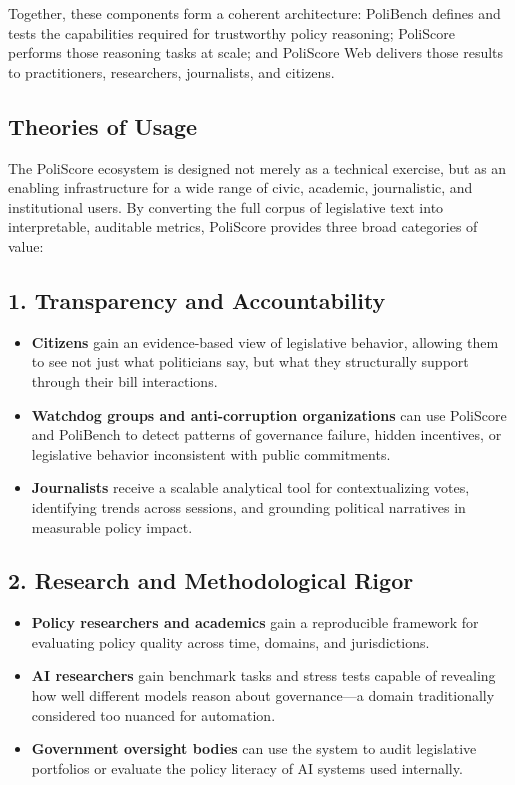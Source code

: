 \documentclass[12pt]{article}
\begin{document}
Together, these components form a coherent architecture: PoliBench defines and tests the capabilities required for
trustworthy policy reasoning; PoliScore performs those reasoning tasks at scale; and PoliScore Web delivers those results
to practitioners, researchers, journalists, and citizens.



\subsection{Theories of Usage}

The PoliScore ecosystem is designed not merely as a technical exercise, but as an enabling infrastructure for a wide
range of civic, academic, journalistic, and institutional users. By converting the full corpus of legislative text into
interpretable, auditable metrics, PoliScore provides three broad categories of value:

\subsection*{1. Transparency and Accountability}
\begin{itemize}
    \item \textbf{Citizens} gain an evidence-based view of legislative behavior, allowing them to see not just what
    politicians say, but what they structurally support through their bill interactions.
    \item \textbf{Watchdog groups and anti-corruption organizations} can use PoliScore and PoliBench to detect patterns
    of governance failure, hidden incentives, or legislative behavior inconsistent with public commitments.
    \item \textbf{Journalists} receive a scalable analytical tool for contextualizing votes, identifying trends across
    sessions, and grounding political narratives in measurable policy impact.
\end{itemize}

\subsection*{2. Research and Methodological Rigor}
\begin{itemize}
    \item \textbf{Policy researchers and academics} gain a reproducible framework for evaluating policy quality across
    time, domains, and jurisdictions.
    \item \textbf{AI researchers} gain benchmark tasks and stress tests capable of revealing how well different models
    reason about governance—a domain traditionally considered too nuanced for automation.
    \item \textbf{Government oversight bodies} can use the system to audit legislative portfolios or evaluate the policy
    literacy of AI systems used internally.
\end{itemize}
\end{document}
